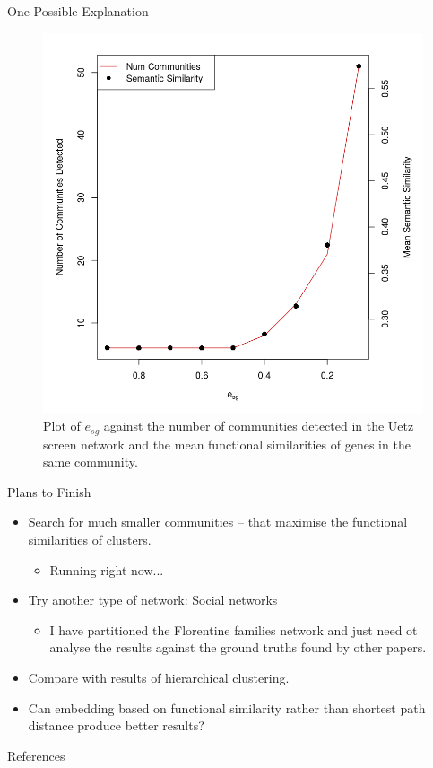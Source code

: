 \documentclass{beamer}
\begin{document}
	\begin{frame}{One Possible Explanation}
		\begin{figure}
			\centering
			\includegraphics[scale=0.35]{justification.png}
			\caption{Plot of $e_{sg}$ against the number of communities detected in the Uetz screen network and the mean functional similarities of genes in the same community.}
		\end{figure}
	\end{frame}
	
	\begin{frame}{Plans to Finish}
		\begin{itemize}
			\item Search for much smaller communities -- that maximise the functional similarities of clusters.
			\begin{itemize}
				\item Running right now...
			\end{itemize}
			\item Try another type of network: Social networks 
			\begin{itemize}
				\item I have partitioned the Florentine families network and just need ot analyse the results against the ground truths found by other papers.
			\end{itemize}
			\item Compare with results of hierarchical clustering.
			\item Can embedding based on functional similarity rather than shortest path distance produce better results?
		\end{itemize}
	\end{frame}	
	
	\begin{frame}[allowframebreaks]{References}
		
		
	\end{frame}
	
\end{document}
